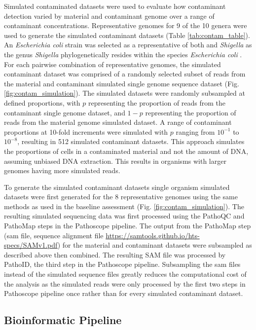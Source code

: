 \documentclass[fleqn,10pt,lineno]{wlpeerj}\usepackage[]{graphicx}\usepackage[]{color}
\begin{document}
Simulated contaminated datasets were used to evaluate how contaminant detection varied by material and contaminant genome over a range of contaminant concentrations.
Representative genomes for 9 of the 10 genera were used to generate the simulated contaminant datasets (Table \ref{tab:contam_table}).
An \textit{Escherichia coli} strain was selected as a representative of both  and \textit{Shigella} as the genus \textit{Shigella} phylogenetically resides within the species \textit{Escherichia coli} \citep{lan2002escherichia}.
For each pairwise combination of representative genomes, the simulated contaminant dataset was comprised of a randomly selected subset of reads from the material and contaminant simulated single genome sequence dataset (Fig. \ref{fig:contam_simulation}).
The simulated datasets were randomly subsampled at defined proportions, with $p$ representing the proportion of reads from the contaminant single genome dataset, and $1-p$ representing the proportion of reads from the material genome simulated dataset.
A range of contaminant proportions at 10-fold increments were simulated with $p$ ranging from $10^{-1}$ to $10^{-8}$, resulting in 512 simulated contaminant datasets.
This approach simulates the proportions of cells in a contaminated material and not the amount of DNA, assuming unbiased DNA extraction. 
This results in organisms with larger genomes having more simulated reads.  


To generate the simulated contaminant datasets single organism simulated datasets were first generated for the 8 representative genomes using the same methods as used in the baseline assessment (Fig. \ref{fig:contam_simulation}).
The resulting simulated sequencing data was first processed using the PathoQC and PathoMap steps in the Pathoscope pipeline.
The output from the PathoMap step (sam file, sequence alignment file \url{https://samtools.github.io/hts-specs/SAMv1.pdf}) for the material and contaminant datasets were subsampled as described above then combined. 
The resulting SAM file was processed by PathoID, the third step in the Pathoscope pipeline.
Subsampling the sam files instead of the simulated sequence files greatly reduces the computational cost of the analysis as the simulated reads were only processed by the first two steps in Pathoscope pipeline once rather than for every simulated contaminant dataset.


\subsection*{Bioinformatic Pipeline}
\end{document}
